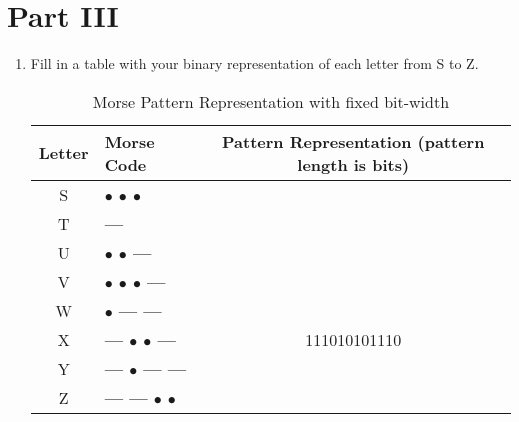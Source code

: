 \documentclass[parskip=half]{scrarticle}
\begin{document}
\section*{Part III}

\begin{enumerate}
\item Fill in a table with your binary representation of each letter from S to Z.

\begin{table}[ht!]
\centering
\begin{tabular}{|c|l|c|} \hline
    \textbf{Letter} & \textbf{Morse Code} & \textbf{Pattern Representation (pattern length is \underline{\hspace{1cm}} bits)} \\ \hline

    S & \textbf{$\bullet$ $\bullet$ $\bullet$} & \hspace{2cm} \\ \hline
    T & \textbf{---} & \\ \hline
    U & \textbf{$\bullet$ $\bullet$ --- } & \\ \hline
    V & \textbf{$\bullet$ $\bullet$ $\bullet$ --- } & \\ \hline
    W & \textbf{$\bullet$ --- ---} & \\ \hline
    X & \textbf{--- $\bullet$ $\bullet$ ---} & 111010101110\\ \hline
    Y & \textbf{--- $\bullet$ --- ---} & \\ \hline
    Z & \textbf{--- --- $\bullet$ $\bullet$} & \\ \hline

\end{tabular}
\caption{Morse Pattern Representation with fixed bit-width}
\label{tab:morse:pattern}
\end{table}
\end{enumerate}
\end{document}
